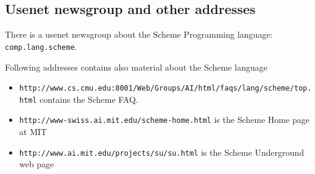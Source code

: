 \subsection{Usenet newsgroup and other addresses}

There is a usenet newsgroup about the Scheme Programming language: {\tt
comp.lang.scheme}.

Following addresses contains also material about the Scheme language

\begin{itemize}
\item {\tt http://www.cs.cmu.edu:8001/Web/Groups/AI/html/faqs/lang/scheme/top.html}
contains the Scheme FAQ.
\item {\tt http://www-swiss.ai.mit.edu/scheme-home.html} is the Scheme Home page
at MIT
\item {\tt http://www.ai.mit.edu/projects/su/su.html} is the Scheme Underground
web page
\end{itemize}

